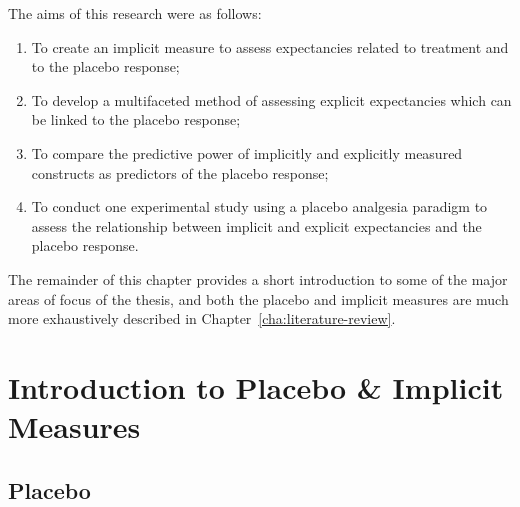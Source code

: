 




The aims of this research were as follows:


\begin{enumerate}


\item To create an implicit measure to assess expectancies related to treatment and to the placebo response;

\item To develop a multifaceted method of assessing explicit expectancies which can be linked to the placebo response;

\item To compare the predictive power of implicitly and explicitly measured constructs as predictors of the placebo response;

\item To conduct one  experimental study using a placebo analgesia paradigm to assess the relationship between implicit and explicit expectancies and the placebo response.
\end{enumerate}

The remainder of this chapter provides a short introduction to some of the major areas of focus of the thesis, and both the placebo and implicit measures are much more exhaustively described in Chapter~\ref{cha:literature-review}. 


\section{Introduction to Placebo \& Implicit Measures}
\label{sec:intr-plac-impl-meas}

\subsection{Placebo}
\label{sec:placebo}

